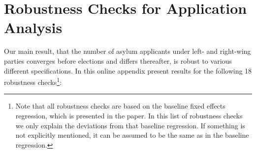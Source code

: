 \documentclass[11pt,a4paper]{scrartcl}
\begin{document}
 

 

\clearpage
\FloatBarrier
\section{Robustness Checks for Application Analysis}
Our main result, that the number of asylum applicants under left- and right-wing parties converges before elections and differs thereafter,  is robust to various different specifications. In this online appendix present results for the following 18 robustness checks\footnote{Note that all robustness checks are based on the baseline fixed effects regression, which is presented in the paper. In this list of robustness checks we only explain the deviations from that baseline regression. If something is not explicitly mentioned, it can be assumed to be the same as in the baseline regression.}:
\end{document}
